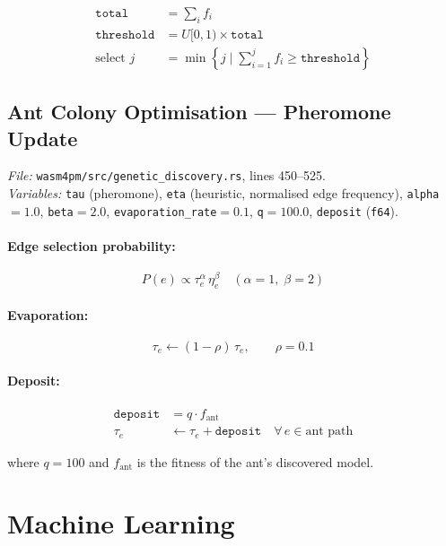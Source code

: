 \documentclass[11pt,a4paper]{article}
\begin{document}
\begin{align}
  \texttt{total} &= \sum_{i} f_i \\[4pt]
  \texttt{threshold} &= U[0,1) \times \texttt{total} \\[4pt]
  \text{select } j &= \min\left\{j \;\Big|\; \sum_{i=1}^j f_i \geq \texttt{threshold}\right\}
\end{align}

\subsection{Ant Colony Optimisation — Pheromone Update}
\textit{File:} \texttt{wasm4pm/src/genetic\_discovery.rs}, lines 450--525.\\
\textit{Variables:} \texttt{tau} (pheromone), \texttt{eta} (heuristic, normalised edge frequency), \texttt{alpha}$=1.0$, \texttt{beta}$=2.0$, \texttt{evaporation\_rate}$=0.1$, \texttt{q}$=100.0$, \texttt{deposit} (\texttt{f64}).

\paragraph{Edge selection probability:}
\begin{equation}
  P(e) \propto \tau_e^{\alpha}\,\eta_e^{\beta}
  \quad(\alpha=1,\;\beta=2)
\end{equation}

\paragraph{Evaporation:}
\begin{equation}
  \tau_e \leftarrow (1 - \rho)\,\tau_e, \qquad \rho = 0.1
\end{equation}

\paragraph{Deposit:}
\begin{align}
  \texttt{deposit} &= q \cdot f_\text{ant} \\
  \tau_e &\leftarrow \tau_e + \texttt{deposit} \quad\forall\, e \in \text{ant path}
\end{align}

where $q=100$ and $f_\text{ant}$ is the fitness of the ant's discovered model.

\section{Machine Learning}
\end{document}
